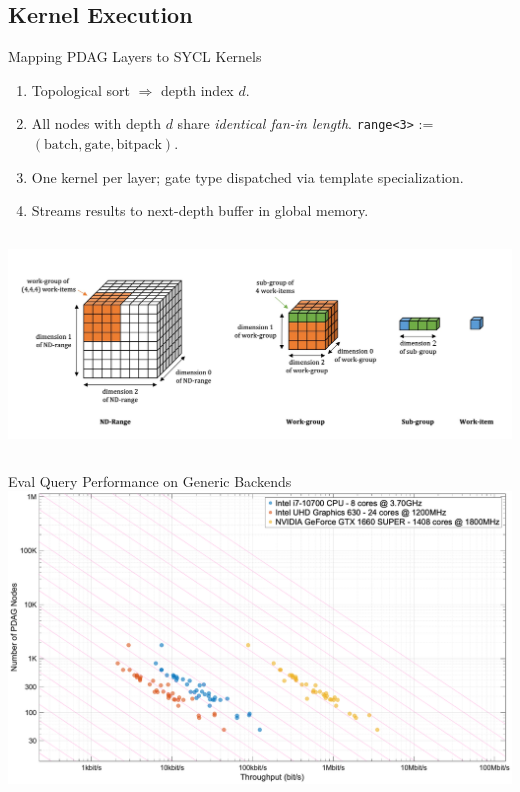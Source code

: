 \subsection{Kernel Execution}
\begin{frame}{Mapping PDAG Layers to SYCL Kernels}
    \tiny
  \begin{enumerate}
    \item Topological sort $\Rightarrow$ depth index $d$.
    \item All nodes with depth $d$ share \emph{identical fan-in length}.  \texttt{range<3>} := $(\text{batch},\text{gate},\text{bitpack})$.
    \item One kernel per layer; gate type dispatched via template specialization.
    \item Streams results to next-depth buffer in global memory.
  \end{enumerate}
  \vspace{-42pt}
  \begin{columns}
        \centering
      \includegraphics[width=1\textwidth]{2_framework/research_objective_2_sycl_eval/sycl.png}
        \centering
        
  \end{columns}

\end{frame}

\begin{frame}{Eval Query Performance on Generic Backends}
\centering
        \includegraphics[height=0.9\textheight]{2_framework/research_objective_2_sycl_eval/slides_nodes_vs_throughput.eps}
\end{frame}

